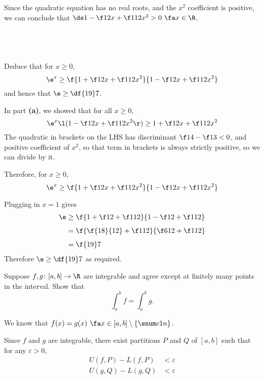 \documentclass[a4paper]{article}
\begin{document}
Since the quadratic equation has no real roots, and the $x^2$ coefficient is positive, we can conclude that $\ds 1 - \f12 x + \f1{12} x^2 > 0\ \fa x \in \R$.

\subsection{~} %

\begin{questionbody}
Deduce that for $x \ge 0$, \[
\e^x \ge \f{1 + \f12 x + \f1{12} x^2}{1 - \f12 x + \f1{12} x^2}
\] and hence that $\e \ge \df{19}7$.
\end{questionbody}

In part \textbf{(a)}, we showed that for all $x \ge 0$, $$\e^x \l( 1 - \f12 x + \f1{12} x^2 \r) \ge 1 + \f12 x + \f1{12} x^2$$
The quadratic in brackets on the LHS has discriminant $\f14 - \f13 < 0$, and positive coefficient of $x^2$, so that term in brackets is always strictly positive, so we can divide by it.

Therefore, for $x \ge 0$, $$\e^x \ge \f{1 + \f12 x + \f1{12} x^2}{1 - \f12 x + \f1{12} x^2}$$

Plugging in $x=1$ gives \begin{align*}
\e &\ge \f{1 + \f12 + \f1{12}}{1 - \f12 + \f1{12}}\\[1ex]
&= \f{\f{18}{12} + \f1{12}}{\f6{12} + \f1{12}}\\[1ex]
&= \f{19}7
\end{align*}
Therefore $\e \ge \df{19}7$ as required.



\begin{questionbody}
Suppose $f, g \colon [a, b] \to \R$ are integrable and agree except at finitely many points in the interval. Show that \[
\int_a^b f = \int_a^b g.
\]
\end{questionbody}

We know that $f(x) = g(x) \ \fa x \in [a,b] \setminus \{\enum c1n\}$.


Since $f$ and $g$ are integrable, there exist partitions $P$ and $Q$ of $[a,b]$ such that for any $\varepsilon > 0$, \begin{align*}
U(f, P) - L(f, P) &< \varepsilon\\
U(g, Q) - L(g, Q) &< \varepsilon
\end{align*}
\end{document}
